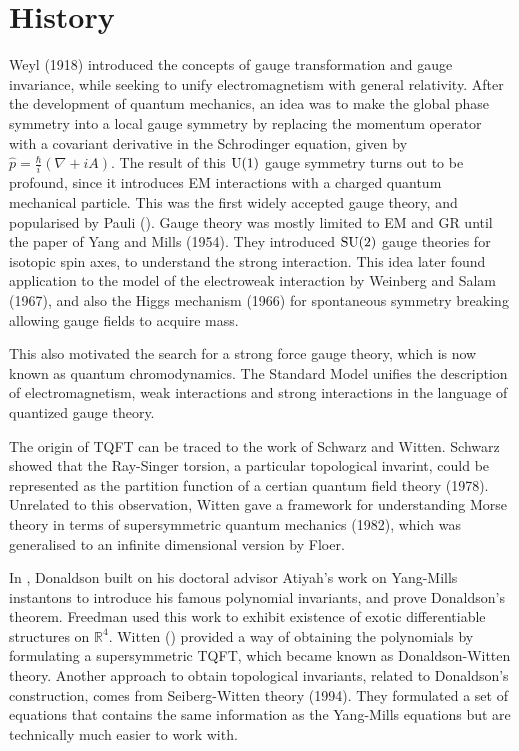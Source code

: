 \section{History}
Weyl (1918) introduced the concepts of gauge transformation and gauge
invariance, while seeking to unify electromagnetism with general relativity. After the
development of quantum mechanics, an idea was to make the global phase symmetry
into a local gauge symmetry by replacing the momentum operator with a covariant 
derivative in the Schrodinger equation, given by 
$\widehat{p}=\frac{\hbar}{i}(\nabla+iA)$. The result of this $\operatorname{U}(1)$ gauge symmetry
turns out to be profound, since it introduces EM interactions with a charged
quantum mechanical particle. This was the first widely accepted gauge theory,
and popularised by Pauli (\citeyear{pauli_em}).\cite{pauli_em}
Gauge theory was mostly limited to EM and GR until the paper of Yang and Mills 
(1954). They introduced $\operatorname{SU}(2)$ gauge theories for
isotopic spin axes, to understand the strong interaction. This idea later found
application to the model of the electroweak interaction by Weinberg and Salam
(1967), and also the Higgs mechanism (1966) for spontaneous symmetry breaking
allowing gauge fields to acquire mass. 

This also motivated the search for a strong force gauge theory, which is now
known as quantum chromodynamics. The Standard Model unifies the description of
electromagnetism, weak interactions and strong interactions in the language of
quantized gauge theory. 

The origin of TQFT can be traced to the work of Schwarz and Witten.
Schwarz showed that the Ray-Singer torsion, a particular topological invarint,
could be represented as the partition function of a certian quantum field theory
(1978). Unrelated to this observation, Witten gave a framework for understanding
Morse theory in terms of supersymmetric quantum mechanics (1982), which was 
generalised to an infinite dimensional version by Floer. 

In \citeyear{don83}, Donaldson built on his doctoral advisor Atiyah's work on 
Yang-Mills instantons to introduce his famous polynomial invariants, and prove 
Donaldson's theorem.\cite{don83}
Freedman used this work to exhibit existence of exotic differentiable
structures on $\mathbb{R}^{4}$. 
Witten (\citeyear{wittenTQFT}) provided a way
of obtaining the polynomials by formulating a supersymmetric TQFT, which became
known as Donaldson-Witten theory.\cite{wittenTQFT}
Another approach to obtain topological invariants, related to Donaldson's
construction, comes from Seiberg-Witten theory (1994). They formulated a set of
equations that contains the same information as the Yang-Mills equations but
are technically much easier to work with. 

